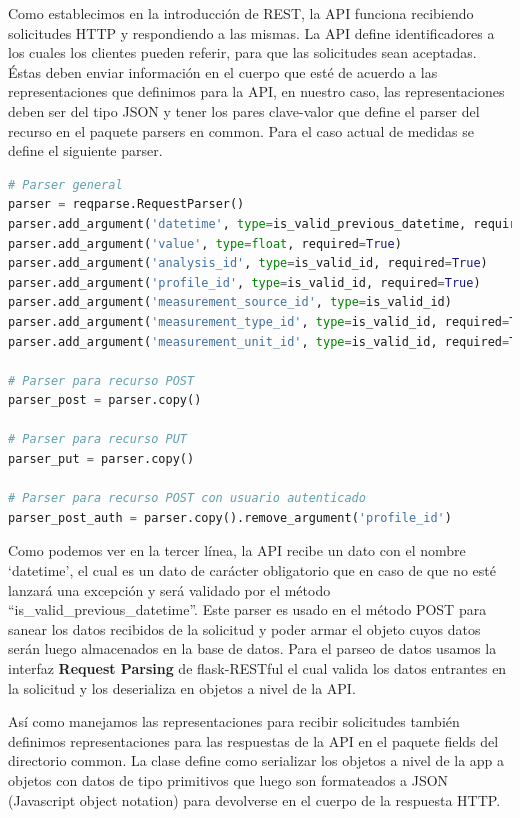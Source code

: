Como establecimos en la introducción de REST, la API funciona recibiendo solicitudes HTTP y respondiendo a las mismas. La API define identificadores a los cuales los clientes pueden referir, para que las solicitudes sean aceptadas. Éstas deben enviar información en el cuerpo que esté de acuerdo a las representaciones que definimos para la API, en nuestro caso, las representaciones deben ser del tipo JSON y tener los pares clave-valor que define el parser del recurso en el paquete parsers en common. Para el caso actual de medidas se define el siguiente parser.

\begin{lstlisting}[language=Python]
# Parser general
parser = reqparse.RequestParser()
parser.add_argument('datetime', type=is_valid_previous_datetime, required=True)
parser.add_argument('value', type=float, required=True)
parser.add_argument('analysis_id', type=is_valid_id, required=True)
parser.add_argument('profile_id', type=is_valid_id, required=True)
parser.add_argument('measurement_source_id', type=is_valid_id)
parser.add_argument('measurement_type_id', type=is_valid_id, required=True)
parser.add_argument('measurement_unit_id', type=is_valid_id, required=True)

# Parser para recurso POST
parser_post = parser.copy()

# Parser para recurso PUT
parser_put = parser.copy()

# Parser para recurso POST con usuario autenticado
parser_post_auth = parser.copy().remove_argument('profile_id')
\end{lstlisting}

Como podemos ver en la tercer línea, la API recibe un dato con el nombre ‘datetime’, el cual es un dato de carácter obligatorio que en caso de que no esté lanzará una excepción y será validado  por el método ``is\_valid\_previous\_datetime''. Este parser es usado en el método POST para sanear los datos recibidos de la solicitud y poder armar el objeto cuyos datos serán luego almacenados en la base de datos. Para el parseo de datos usamos la interfaz \textbf{Request Parsing} de flask-RESTful el cual valida los datos entrantes en la solicitud y los deserializa en objetos a nivel de la API.

Así como manejamos las representaciones para recibir solicitudes también definimos representaciones para las respuestas de la API en el paquete fields del directorio common. La clase define como serializar los objetos a nivel de la app a objetos con datos de tipo primitivos que luego son formateados a JSON (Javascript object notation) para devolverse en el cuerpo de la respuesta HTTP.

